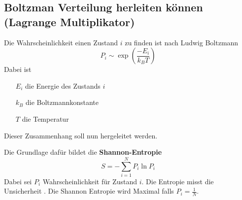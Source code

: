\documentclass[]{article}
\begin{document}
\subsection*{Boltzman Verteilung herleiten können (Lagrange Multiplikator)}
Die Wahrscheinlichkeit einen Zustand $i$ zu finden ist nach Ludwig Boltzmann
\begin{equation*}
P_i \sim \exp \left( \frac{-E_i}{k_B T} \right)
\end{equation*}
Dabei ist 
\begin{itemize}
	\item[$E_i$] die Energie des Zustands $i$
	\item[$k_B$] die Boltzmannkonstante
	\item[$T$] die Temperatur
\end{itemize}
Dieser Zusammenhang soll nun hergeleitet werden.

Die Grundlage dafür bildet die \textbf{Shannon-Entropie}
\begin{equation*}
S = - \sum_{i=1}^N P_i \ln P_i
\end{equation*}
Dabei sei $P_i$ Wahrscheinlichkeit für Zustand $i$. Die Entropie misst die Unsicherheit . Die Shannon Entropie wird Maximal falls $P_i = \frac{1}{N}$.
\end{document}
